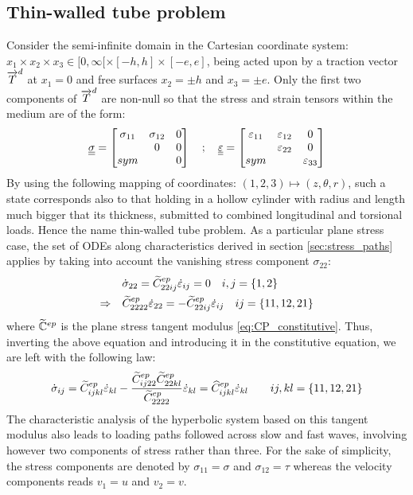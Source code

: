\subsection{Thin-walled tube problem}
\label{sec:num_thin-walled}
Consider the semi-infinite domain in the Cartesian coordinate system: $x_1 \times x_2 \times x_3 \in [0,\infty[ \times [-h,h] \times [-e,e]$, being acted upon by a traction vector ${\overrightarrow{T}}^d$ at $x_1=0 $ and free surfaces $x_2=\pm h$ and $x_3=\pm e$.
Only the first two components of ${\overrightarrow{T}}^d$ are non-null so that the stress and strain tensors within the medium are of the form:
\begin{equation}
  {\underline{\underline{\sigma}}} = \left[\begin{matrix}\sigma_{11} & \sigma_{12} & 0\\  & 0 & 0\\sym & & 0\end{matrix}\right] \quad ;\quad{\underline{\underline{\varepsilon}}} = \left[\begin{matrix}\varepsilon_{11} & \varepsilon_{12} &0 \\  & \varepsilon_{22}&0 \\sym & & \varepsilon_{33}\end{matrix}\right]
\end{equation}
By using the following mapping of coordinates: $(1,2,3) \mapsto (z,\theta,r)$, such a state corresponds also to that 
holding in a hollow cylinder with radius and length much bigger that its thickness, submitted to combined longitudinal and torsional loads.
Hence the name thin-walled tube problem. 
As a particular plane stress case, the set of ODEs along characteristics derived in section \ref{sec:stress_paths} applies by taking into account the vanishing stress component $\sigma_{22}$:
\begin{align*}
  & \dot{\sigma}_{22}=\widetilde{C}^{ep}_{22ij} \dot{\varepsilon}_{ij} =0 \quad i,j=\{1,2\} \\
  \Rightarrow  \quad  &\widetilde{C}^{ep}_{2222} \dot{\varepsilon}_{22} = - \widetilde{C}^{ep}_{22ij}\dot{\varepsilon}_{ij} \quad ij=\{11,12,21\}
\end{align*}
where $\widetilde{\mathbb{C}}^{ep}$ is the plane stress tangent modulus \eqref{eq:CP_constitutive}.
Thus, inverting the above equation and introducing it in the constitutive equation, we are left with the following law:
\begin{equation}
  \label{eq:ch5_TW_tangent}
  \dot{\sigma}_{ij}=\widetilde{C}^{ep}_{ijkl} \dot{\varepsilon}_{kl} - \frac{\widetilde{C}^{ep}_{ij22}\widetilde{C}^{ep}_{22kl}}{\widetilde{C}^{ep}_{2222}}\dot{\varepsilon}_{kl}= \widehat{C}^{ep}_{ijkl} \dot{\varepsilon}_{kl}\qquad ij,kl=\{11,12,21\} 
\end{equation}
The characteristic analysis of the hyperbolic system based on this tangent modulus also leads to loading paths followed across slow and fast waves, involving however two components of stress rather than three. For the sake of simplicity, the stress components are denoted by $\sigma_{11}=\sigma$ and $\sigma_{12}=\tau$ whereas the velocity components reads $v_1=u$ and $v_2=v$.

